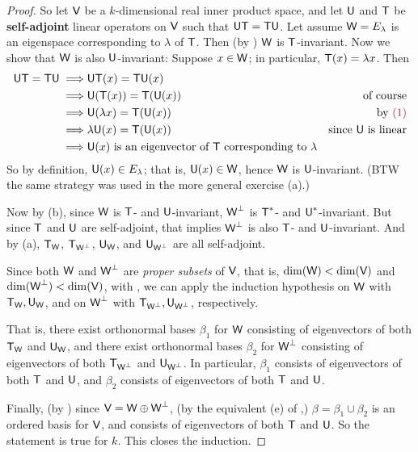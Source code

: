 \begin{proof}
So let \(\textsf{V}\) be a \(k\)-dimensional real inner product space, and let \(\textsf{U}\) and \(\textsf{T}\) be \textbf{self-adjoint} linear operators on \(\textsf{V}\) such that \(\textsf{U}\textsf{T} = \textsf{T}\textsf{U}\).
Let assume \(\textsf{W} = E_{\lambda}\) is an eigenspace corresponding to \(\lambda\) of \(\textsf{T}\).
Then (by ) \(\textsf{W}\) is \(\textsf{T}\)-invariant.
Now we show that \(\textsf{W}\) is also \(\textsf{U}\)-invariant:
Suppose \(x \in \textsf{W}\); in particular, \(\textsf{T}(x) = \lambda x\). 
Then
\begin{align*}
    \U\T = \T\U \implies & \U\T(x) = \T\U(x) \\
        \implies & \U(\T(x)) = \T(\U(x)) & \text{of course} \\
        \implies & \U(\lambda x) = \T(\U(x)) & \text{by \MAROON{(1)}} \\
        \implies & \lambda \U(x) = \T(\U(x)) & \text{since \(\U\) is linear} \\
        \implies & \U(x) \text{ is an eigenvector of \(\T\) corresponding to } \lambda
\end{align*}
So by definition, \(\textsf{U}(x) \in E_{\lambda}\); that is, \(\textsf{U}(x) \in \textsf{W}\), hence \(\textsf{W}\) is \(\textsf{U}\)-invariant. 
(BTW the same strategy was used in the more general exercise (a).)

Now by (b), since \(\textsf{W}\) is \(\textsf{T}\)- and \(\textsf{U}\)-invariant, \(\textsf{W}^{\perp}\) is \(\textsf{T}^*\)- and \(\textsf{U}^*\)-invariant.
But since \(\textsf{T}\) and \(\textsf{U}\) are self-adjoint, that implies \(\textsf{W}^{\perp}\) is also \(\textsf{T}\)- and \(\textsf{U}\)-invariant.
And by (a), \(\textsf{T}_{\textsf{W}}\), \(\textsf{T}_{\textsf{W}^{\perp}}\), \(\textsf{U}_{\textsf{W}}\), and \(\textsf{U}_{\textsf{W}^{\perp}}\) are all self-adjoint. 

Since both \(\textsf{W}\) and \(\textsf{W}^{\perp}\) are \emph{proper subsets} of \(\textsf{V}\), that is, \(\dim(\textsf{W}) < \dim(\textsf{V})\) and \(\dim(\textsf{W}^{\perp}) < \dim(\textsf{V})\),
with , we can apply the induction hypothesis on \(\textsf{W}\) with \(\textsf{T}_{\textsf{W}}, \textsf{U}_{\textsf{W}}\), and on \(\textsf{W}^{\perp}\) with \(\textsf{T}_{\textsf{W}^{\perp}}, \textsf{U}_{\textsf{W}^{\perp}}\), respectively.

That is, there exist orthonormal bases \(\beta_1\) for \(\textsf{W}\) consisting of eigenvectors of both \(\textsf{T}_{\textsf{W}}\) and \(\textsf{U}_{\textsf{W}}\),
and there exist orthonormal bases \(\beta_2\) for \(\textsf{W}^{\perp}\) consisting of eigenvectors of both \(\textsf{T}_{\textsf{W}^{\perp}}\) and \(\textsf{U}_{\textsf{W}^{\perp}}\).
In particular, \(\beta_1\) consists of eigenvectors of both \(\textsf{T}\) and \(\textsf{U}\), and \(\beta_2\) consists of eigenvectors of both \(\textsf{T}\) and \(\textsf{U}\).

Finally, (by ) since \(\textsf{V} = \textsf{W} \oplus \textsf{W}^{\perp}\), (by the equivalent (e) of ,) \(\beta = \beta_1 \cup \beta_2\) is an ordered basis for \(\textsf{V}\), and consists of eigenvectors of both \(\textsf{T}\) and \(\textsf{U}\).
So the statement is true for \(k\).
This closes the induction.
\end{proof}

